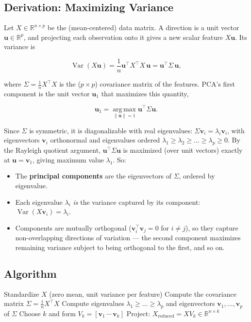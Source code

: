 \documentclass[11pt]{article}
\begin{document}
\subsection{Derivation: Maximizing Variance}

Let $X \in \mathbb{R}^{n \times p}$ be the (mean-centered) data matrix. A
direction is a unit vector $\mathbf{u} \in \mathbb{R}^p$, and projecting
each observation onto it gives a new scalar feature $X\mathbf{u}$. Its
variance is

\[
  \operatorname{Var}(X\mathbf{u}) = \frac{1}{n} \mathbf{u}^\top X^\top X \, \mathbf{u}
  = \mathbf{u}^\top \Sigma \, \mathbf{u},
\]

where $\Sigma = \frac{1}{n} X^\top X$ is the ($p \times p$) covariance
matrix of the features. PCA's first component is the unit vector
$\mathbf{u}_1$ that maximizes this quantity,

\[
  \mathbf{u}_1 = \operatorname*{arg\,max}_{\lVert \mathbf{u} \rVert = 1} \mathbf{u}^\top \Sigma \mathbf{u}.
\]

Since $\Sigma$ is symmetric, it is diagonalizable with real eigenvalues:
$\Sigma \mathbf{v}_i = \lambda_i \mathbf{v}_i$, with eigenvectors
$\mathbf{v}_i$ orthonormal and eigenvalues ordered
$\lambda_1 \ge \lambda_2 \ge \dots \ge \lambda_p \ge 0$. By the Rayleigh
quotient argument, $\mathbf{u}^\top \Sigma \mathbf{u}$ is maximized (over
unit vectors) exactly at $\mathbf{u} = \mathbf{v}_1$, giving maximum value
$\lambda_1$. So:

\begin{itemize}
  \item The \textbf{principal components} are the eigenvectors of $\Sigma$,
        ordered by eigenvalue.
  \item Each eigenvalue $\lambda_i$ \emph{is} the variance captured by its
        component: $\operatorname{Var}(X\mathbf{v}_i) = \lambda_i$.
  \item Components are mutually orthogonal ($\mathbf{v}_i^\top \mathbf{v}_j = 0$
        for $i \ne j$), so they capture non-overlapping directions of
        variation --- the second component maximizes remaining variance
        subject to being orthogonal to the first, and so on.
\end{itemize}

\subsection{Algorithm}

\begin{algorithm}[h]
\caption{PCA}
\begin{algorithmic}[1]
\State Standardize $X$ (zero mean, unit variance per feature)
\State Compute the covariance matrix $\Sigma = \frac{1}{n} X^\top X$
\State Compute eigenvalues $\lambda_1 \ge \dots \ge \lambda_p$ and eigenvectors $\mathbf{v}_1, \dots, \mathbf{v}_p$ of $\Sigma$
\State Choose $k$ and form $V_k = [\mathbf{v}_1 \, \cdots \, \mathbf{v}_k]$
\State Project: $X_{\text{reduced}} = X V_k \in \mathbb{R}^{n \times k}$
\end{algorithmic}
\end{algorithm}
\end{document}
